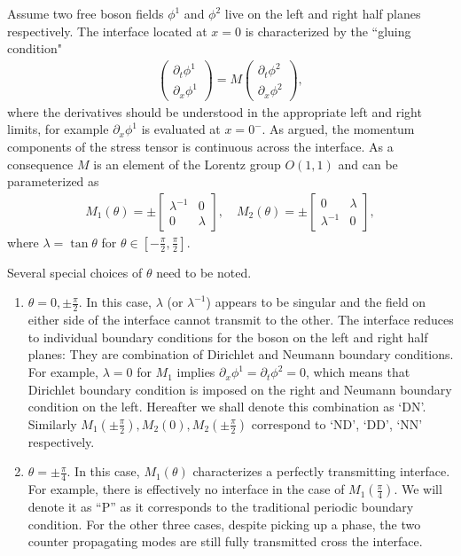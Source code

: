 Assume two free boson fields $\phi^1$ and $\phi^2$ live on the left and right half planes respectively. The interface located at $x = 0$ is characterized by the ``gluing condition"
\begin{equation}\begin{aligned}
\label{eq:def_M}
\begin{pmatrix}
\partial_t\phi^1\\
\partial_x\phi^1
\end{pmatrix}
=M\begin{pmatrix}
\partial_t\phi^2\\
\partial_x\phi^2
\end{pmatrix},
\end{aligned}\end{equation}
where the derivatives should be understood in the appropriate left and right limits, for example $\partial_x \phi^1$ is evaluated at $ x = 0^-$. As argued, the momentum components of the stress tensor is continuous across the interface. As a consequence $M$ is an element of the Lorentz group $O(1,1)$ and can be parameterized as
\begin{equation}\begin{aligned}
\label{eq:M1M2}
M_1(\theta)=\pm
\begin{bmatrix}
\lambda^{-1} & 0 \\
0 & \lambda
\end{bmatrix},\quad
M_2(\theta)=\pm
\begin{bmatrix}
0 & \lambda  \\
\lambda^{-1} & 0 
\end{bmatrix},
\end{aligned}\end{equation}
where $\lambda=\tan\theta$ for $\theta\in\left[-\frac{\pi}{2},\frac{\pi}{2}\right]$. 

Several special choices of $\theta$ need to be noted. 
\begin{enumerate}
\item $\theta=0,\pm \frac{\pi}{2}$. In this case, $\lambda$ (or $\lambda^{-1}$) appears to be singular and the field on either side of the interface cannot transmit to the other. The interface reduces to individual boundary conditions for the boson on the left and right half planes: They are combination of Dirichlet and Neumann boundary conditions. For example, $\lambda = 0$ for $M_1$ implies $\partial_x\phi^1 = \partial_t\phi^2 =0$, which means that Dirichlet boundary condition is imposed on the right and Neumann boundary condition on the left. Hereafter we shall denote this combination as `DN'. Similarly $M_1(\pm\frac{\pi}{2}),M_2(0),M_2(\pm \frac{\pi}{2})$ correspond to `ND', `DD', `NN' respectively. 
\item $\theta = \pm \frac{\pi}{4}$. In this case, $M_1(\theta)$ characterizes a perfectly transmitting interface. For example, there is effectively no interface in the case of $M_1( \frac{\pi}{4})$. We will denote it as ``P'' as it corresponds to the traditional periodic boundary condition. For the other three cases, despite picking up a phase, the two counter propagating modes are still fully transmitted cross the interface. 
\end{enumerate}

